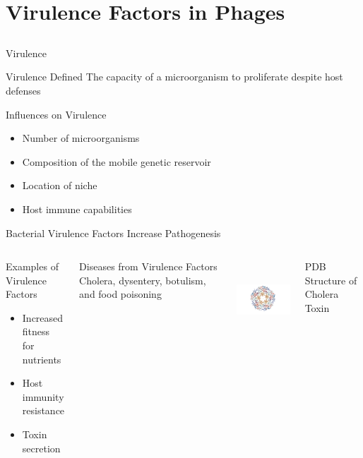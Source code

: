 \documentclass[11pt, xcolor=table]{beamer}
\begin{document}
	

\section{Virulence Factors in Phages}
\subsection{}
	
	\begin{frame}{Virulence}
		\begin{block}{Virulence Defined}
		The capacity of a microorganism to proliferate despite host defenses
		\end{block}
		
		\begin{block}{Influences on Virulence}
		\begin{itemize}
		\item Number of microorganisms
		\item \alert{Composition of the mobile genetic reservoir}
		\item Location of niche
		\item Host immune capabilities
		\end{itemize}
		\end{block}
	
	\end{frame}

	\begin{frame}{Bacterial Virulence Factors Increase Pathogenesis}
	\begin{columns}
	\begin{block}{Examples of Virulence Factors}
		\begin{itemize}
		Genes that may facilitate invasion and evasion 
		\item Increased fitness for nutrients
		\item Host immunity resistance
		\item Toxin secretion
		\end{itemize}
	\end{block} 
	
	\begin{block}{Diseases from Virulence Factors}
	Cholera, dysentery, botulism, and food poisoning
	\end{block}
	

	\includegraphics[height=3cm, width=5cm]{cholera.png}

	\vspace{-0.3cm}
	\hspace{0.5cm}	
	\tiny{PDB Structure of Cholera Toxin}
	\end{columns}
	
	\end{frame}
	
\end{document}

